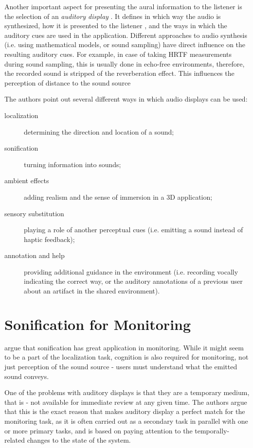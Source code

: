 Another important aspect for presenting the aural information to the listener is the selection of an \textit{auditory display} \parencite[p.~153]{jr_3d_2017}. It defines in which way the audio is synthesized, how it is presented to the listener %
, and the ways in which the auditory cues are used in the application.
Different approaches to audio synthesis (i.e. using mathematical models, or sound sampling) have direct influence on the resulting auditory cues. For example, in case of taking HRTF measurements during sound sampling, this is usually done in echo-free environments, therefore, the recorded sound is stripped of the reverberation effect. This influences the perception of distance to the sound source

The authors point out several different ways in which audio displays can be used:
\begin{description}
	\item[localization] determining the direction and location of a sound;
	\item[sonification] turning information into sounds;
	\item[ambient effects] adding realism and the sense of immersion in a 3D application;
	\item[sensory substitution] playing a role of another perceptual cues (i.e. emitting a sound instead of haptic feedback); 
	\item[annotation and help] providing additional guidance in the environment (i.e. recording vocally indicating the correct way, or the auditory annotations of a previous user about an artifact in the shared environment).
\end{description}

\section{Sonification for Monitoring}
\parencite{hermann_sonification_2011} argue that sonification has great application in monitoring. While it might seem to be a part of the localization task, cognition is also required for monitoring, not just perception of the sound source - users must understand what the emitted sound conveys.

One of the problems with auditory displays is that they are a temporary medium, that is - not available for immediate review at any given time. The authors argue that this is the exact reason that makes auditory display a perfect match for the monitoring task, as it is often carried out as a secondary task in parallel with one or more primary tasks, and is based on paying attention to the temporally-related changes to the state of the system.

